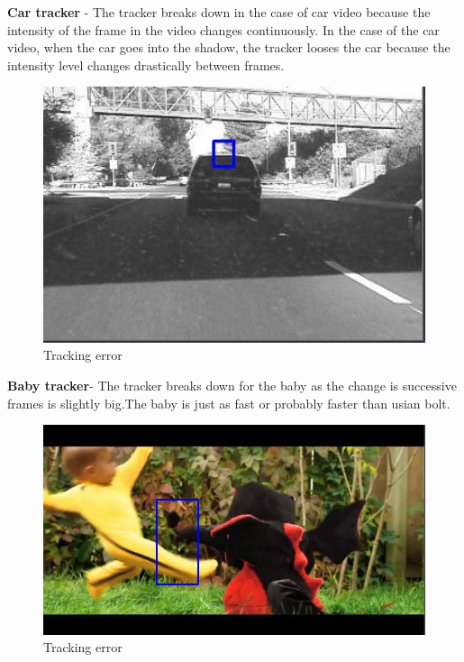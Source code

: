 \documentclass[12pt]{article}
\begin{document}
\textbf{Car tracker} -
The tracker breaks down in the case of car video because the intensity of the frame in the video changes continuously. In the case of the car video, when the car goes into the shadow, the tracker looses the car because the intensity level changes drastically between frames. 
\begin{figure}[h]
    \centering
    \includegraphics[width=12cm]{trackcar3}
    \caption{Tracking error}
    \label{fig:Tracking error}
\end{figure}

\textbf{Baby tracker}-
The tracker breaks down for the baby as the change is successive frames is slightly big.The baby is just as fast or probably 
faster than usian bolt. \\

\begin{figure}[h]
    \centering
    \includegraphics[width=12cm]{trackbaby4}
    \caption{Tracking error}
    \label{fig:Tracking error}
\end{figure}
\end{document}
